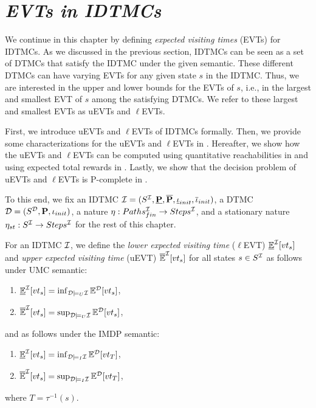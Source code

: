 \chapter{\textit{EVTs in IDTMCs}}
\label{ch:EVTs_in_IDTMCs}

We continue in this chapter by defining \textit{expected visiting times} (EVTs) for IDTMCs. As we discussed in the previous section, IDTMCs can be seen as a set of DTMCs that satisfy the IDTMC under the given semantic. These different DTMCs can have varying EVTs for any given state $s$ in the IDTMC. Thus, we are interested in the upper and lower bounds for the EVTs of $s$, i.e., in the largest and smallest EVT of $s$ among the satisfying DTMCs. We refer to these largest and smallest EVTs as uEVTs and $\ell$EVTs.

First, we introduce uEVTs and $\ell$EVTs of IDTMCs formally. Then, we provide some characterizations for the uEVTs and $\ell$EVTs in . Hereafter, we show how the uEVTs and $\ell$EVTs can be computed using quantitative reachabilities in  and using expected total rewards in . Lastly, we show that the decision problem of uEVTs and $\ell$EVTs is P-complete in .

To this end, we fix an IDTMC $\mathcal{I} = (S^{\mathcal{I}},\mathbf{\underline{P}},\mathbf{\overline{P}},\mathbf{\underline{\iota}}_{init},\mathbf{\overline{\iota}}_{init})$, a DTMC $\mathcal{D} = (S^{\mathcal{D}},\mathbf{P},\iota_{init})$, a nature $\eta:Paths_{fin}^{\mathcal{I}}\rightarrow Steps^{\mathcal{I}}$, and a stationary nature $\eta_{st}:S^{\mathcal{I}}\rightarrow Steps^{\mathcal{I}}$ for the rest of this chapter.


\begin{definition}\label{def:EVTs_of_IDTMCs}
    For an IDTMC $\mathcal{I}$, we define the \textit{lower expected visiting time} ($\ell$EVT) $\mathbb{\underline{E}}^{\mathcal{I}}[vt_s]$ and \textit{upper expected visiting time} (uEVT) $\mathbb{\overline{E}}^{\mathcal{I}}[vt_s]$ for all states $s\in S^{\mathcal{I}}$ as follows under UMC semantic:
    \begin{enumerate}[label=(\roman*)]
        \item $\mathbb{\underline{E}}^{\mathcal{I}}[vt_s] = \inf_{\mathcal{D}\models_U\mathcal{I}} \mathbb{E}^{\mathcal{D}}[vt_s]$,
        \item $\mathbb{\overline{E}}^{\mathcal{I}}[vt_s] = \sup_{\mathcal{D}\models_U\mathcal{I}} \mathbb{E}^{\mathcal{D}}[vt_s]$,
    \end{enumerate}
    and as follows under the IMDP semantic:
    \begin{enumerate}[label=(\roman*)]
        \item $\mathbb{\underline{E}}^{\mathcal{I}}[vt_s]
        = \inf_{\mathcal{D} \models_I \mathcal{I}} \mathbb{E}^{\mathcal{D}}[vt_T]$,
        \item $\mathbb{\overline{E}}^{\mathcal{I}}[vt_s]
        = \sup_{\mathcal{D} \models_I \mathcal{I}} \mathbb{E}^{\mathcal{D}}[vt_T]$,
    \end{enumerate}
    where $T = \tau^{-1}(s)$.
\end{definition}

